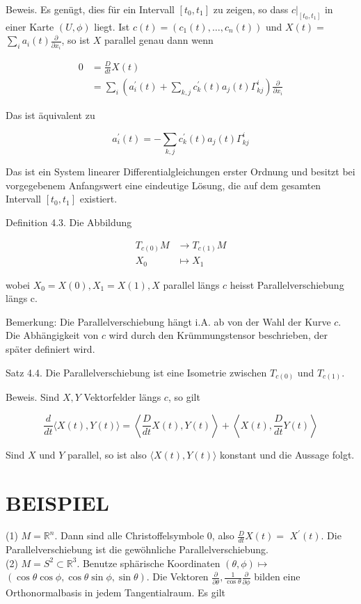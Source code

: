 \documentclass[10pt]{article}
\begin{document}
Beweis. Es genügt, dies für ein Intervall $\left[t_{0}, t_{1}\right]$ zu zeigen, so dass $\left.c\right|_{\left[t_{0}, t_{1}\right]}$ in einer Karte $(U, \phi)$ liegt. Ist $c(t)=\left(c_{1}(t), \ldots, c_{n}(t)\right)$ und $X(t)=$ $\sum_{i} a_{i}(t) \frac{\partial}{\partial x_{i}}$, so ist $X$ parallel genau dann wenn

$$
\begin{aligned}
0 & =\frac{D}{d t} X(t) \\
& =\sum_{i}\left(a_{i}^{\prime}(t)+\sum_{k, j} c_{k}^{\prime}(t) a_{j}(t) \Gamma_{k j}^{i}\right) \frac{\partial}{\partial x_{i}}
\end{aligned}
$$

Das ist äquivalent zu

$$
a_{i}^{\prime}(t)=-\sum_{k, j} c_{k}^{\prime}(t) a_{j}(t) \Gamma_{k j}^{i}
$$

Das ist ein System linearer Differentialgleichungen erster Ordnung und besitzt bei vorgegebenem Anfangswert eine eindeutige Lösung, die auf dem gesamten Intervall $\left[t_{0}, t_{1}\right]$ existiert.

Definition 4.3. Die Abbildung

$$
\begin{aligned}
T_{c(0)} M & \rightarrow T_{c(1)} M \\
X_{0} & \mapsto X_{1}
\end{aligned}
$$

wobei $X_{0}=X(0), X_{1}=X(1), X$ parallel längs $c$ heisst Parallelverschiebung längs c.

Bemerkung: Die Parallelverschiebung hängt i.A. ab von der Wahl der Kurve $c$. Die Abhängigkeit von $c$ wird durch den Krümmungstensor beschrieben, der später definiert wird.

Satz 4.4. Die Parallelverschiebung ist eine Isometrie zwischen $T_{c(0)}$ und $T_{c(1)}$.

Beweis. Sind $X, Y$ Vektorfelder längs $c$, so gilt

$$
\frac{d}{d t}\langle X(t), Y(t)\rangle=\left\langle\frac{D}{d t} X(t), Y(t)\right\rangle+\left\langle X(t), \frac{D}{d t} Y(t)\right\rangle
$$

Sind $X$ und $Y$ parallel, so ist also $\langle X(t), Y(t)\rangle$ konstant und die Aussage folgt.

\section*{BEISPIEL}
(1) $M=\mathbb{R}^{n}$. Dann sind alle Christoffelsymbole 0, also $\frac{D}{d t} X(t)=$ $X^{\prime}(t)$. Die Parallelverschiebung ist die gewöhnliche Parallelverschiebung.\\
(2) $M=S^{2} \subset \mathbb{R}^{3}$. Benutze sphärische Koordinaten $(\theta, \phi) \mapsto$ $(\cos \theta \cos \phi, \cos \theta \sin \phi, \sin \theta)$. Die Vektoren $\frac{\partial}{\partial \theta}, \frac{1}{\cos \theta} \frac{\partial}{\partial \phi}$ bilden eine Orthonormalbasis in jedem Tangentialraum. Es gilt
\end{document}
